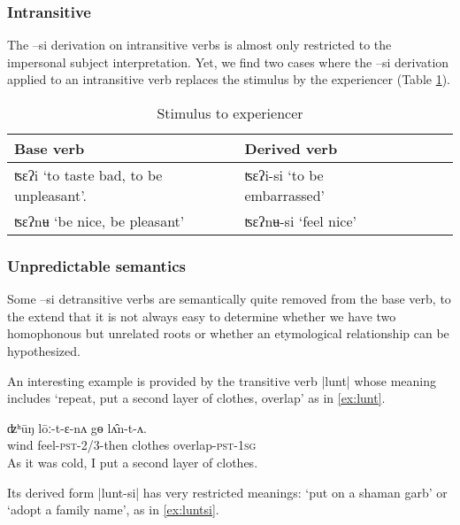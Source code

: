 \documentclass[twoside,a4paper,11pt]{article}
\newcommand{\ipa}[1]{{\phon#1}}
\begin{document}
\subsubsection{Intransitive} 
The \ipa{--si} derivation on intransitive verbs is almost only restricted to the impersonal subject interpretation. Yet, we find two cases where the \ipa{--si} derivation applied to an intransitive verb replaces the stimulus by the experiencer (Table \ref{tab:stimulus}).

\begin{table}[H]
 \centering 
\caption{Stimulus to experiencer  } \label{tab:stimulus}
\begin{tabular}{lllll}
\toprule
Base verb & Derived verb \\
\midrule
\ipa{ʦɛʔi} `to taste bad, to be unpleasant'.    & \ipa{ʦɛʔi-si} `to be embarrassed'  \\
\ipa{ʦɛʔnʉ} `be nice, be pleasant' & \item  \ipa{ʦɛʔnʉ-si} `feel nice' \\
\bottomrule
\end{tabular}
\end{table}
 




\subsubsection{Unpredictable semantics}

Some \ipa{--si} detransitive verbs are semantically quite removed from the base verb, to the extend that it is not always easy to determine whether we have two homophonous but unrelated roots or whether an etymological relationship can be hypothesized.

An interesting example is provided by the transitive verb |\ipa{lunt}| whose meaning includes `repeat, put a second layer of clothes, overlap' as in \ref{ex:lunt}.
\begin{exe}
\ex \label{ex:lunt}
\gll 
\ipa{ʣʰūŋ}  	\ipa{lōː-t-ɛ-nʌ}  	\ipa{gɵ}  	\ipa{lʌ̂n-t-ʌ.}  \\
wind feel-\textsc{pst-2/3}-then clothes overlap-\textsc{pst-1sg} \\ 
\glt As it was cold, I put a second layer of clothes.
\end{exe}

Its derived form |\ipa{lunt-si}| has very restricted meanings: `put on a shaman garb' or `adopt a family name', as in \ref{ex:luntsi}.
\end{document}
